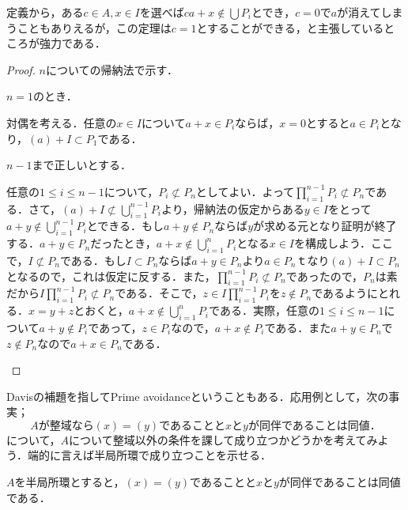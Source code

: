 定義から，ある$c\in A,x\in I$を選べば$ca+x\not\in\bigcup P_i$とでき，$c=0$で$a$が消えてしまうこともありえるが，この定理は$c=1$とすることができる，と主張しているところが強力である．

\begin{proof}
	$n$についての帰納法で示す．
	
	\begin{step}
		\item $n=1$のとき．
		
		対偶を考える．任意の$x\in I$について$a+x\in P_i$ならば，$x=0$とすると$a\in P_i$となり，$(a)+I\subset P_1$である．
		
		\item $n-1$まで正しいとする．
		
		任意の$1\leq i\leq n-1$について，$P_i\not\subset P_n$としてよい．よって$\prod_{i=1}^{n-1}P_i\not\subset P_n$である．さて，$(a)+I\not\subset\bigcup_{i=1}^{n-1}P_i$より，帰納法の仮定からある$y\in I$をとって$a+y\not\in\bigcup_{i=1}^{n-1}P_i$とできる．もし$a+y\not\in P_n$ならば$y$が求める元となり証明が終了する．$a+y\in P_n$だったとき，$a+x\not\in \bigcup_{i=1}^n P_i$となる$x\in I$を構成しよう．ここで，$I\not\subset P_n$である．もし$I\subset P_n$ならば$a+y\in P_n$より$a\in P_n$ｔなり$(a)+I\subset P_n$となるので，これは仮定に反する．また，$\prod_{i=1}^{n-1}P_i\not\subset P_n$であったので，$P_n$は素だから$I\prod_{i=1}^{n-1}P_i\not\subset P_n$である．そこで，$z\in I\prod_{i=1}^{n-1}P_i$を$z\not\in P_n$であるようにとれる．$x=y+z$とおくと，$a+x\not\in\bigcup_{i=1}^n P_i$である．実際，任意の$1\leq i\leq n-1$について$a+y\not\in P_i$であって，$z\in P_i$なので，$a+x\not\in P_i$である．また$a+y\in P_n$で$z\not\in P_n$なので$a+x\in P_n$である．	
	\end{step}
\end{proof}

Davisの補題を指してPrime avoidanceということもある．応用例として，次の事実；
\[A\text{が整域なら}(x)=(y)\text{であることと}x\text{と}y\text{が同伴であることは同値．}\]
について，$A$について整域以外の条件を課して成り立つかどうかを考えてみよう．端的に言えば半局所環で成り立つことを示せる．

\begin{prop}\label{prop:半局所環と同伴関係}
	$A$を半局所環とすると，$(x)=(y)$であることと$x$と$y$が同伴であることは同値である．
\end{prop}

